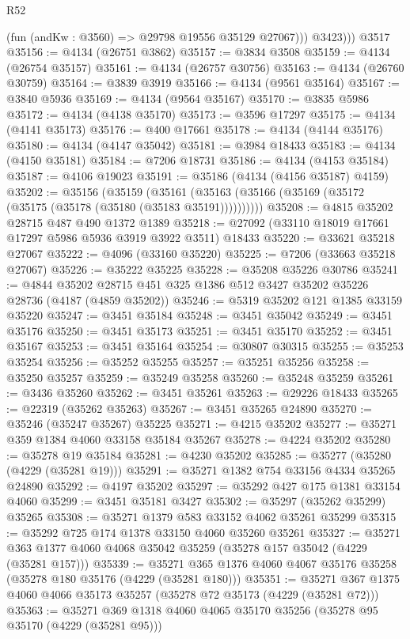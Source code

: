 \begin{lexlean}{R52}
\begin{coremodule}
            (fun (andKw : @3560) => @29798 @19556 @35129 @27067)))
          @3423)))
    @3517
@35156 := @4134 (@26751 @3862)
@35157 := @3834 @3508
@35159 := @4134 (@26754 @35157)
@35161 := @4134 (@26757 @30756)
@35163 := @4134 (@26760 @30759)
@35164 := @3839 @3919
@35166 := @4134 (@9561 @35164)
@35167 := @3840 @5936
@35169 := @4134 (@9564 @35167)
@35170 := @3835 @5986
@35172 := @4134 (@4138 @35170)
@35173 := @3596 @17297
@35175 := @4134 (@4141 @35173)
@35176 := @400 @17661
@35178 := @4134 (@4144 @35176)
@35180 := @4134 (@4147 @35042)
@35181 := @3984 @18433
@35183 := @4134 (@4150 @35181)
@35184 := @7206 @18731
@35186 := @4134 (@4153 @35184)
@35187 := @4106 @19023
@35191 := @35186 (@4134 (@4156 @35187) @4159)
@35202 := @35156
    (@35159 (@35161 (@35163 (@35166 (@35169 (@35172 (@35175 (@35178 (@35180 (@35183 @35191))))))))))
@35208 := @4815 @35202 @28715 @487 @490 @1372 @1389
@35218 := @27092 (@33110 @18019 @17661 @17297 @5986 @5936 @3919 @3922 @3511) @18433
@35220 := @33621 @35218 @27067
@35222 := @4096 (@33160 @35220)
@35225 := @7206 (@33663 @35218 @27067)
@35226 := @35222 @35225
@35228 := @35208 @35226 @30786
@35241 := @4844 @35202 @28715 @451 @325 @1386 @512 @3427 @35202 @35226 @28736 (@4187 (@4859 @35202))
@35246 := @5319 @35202 @121 @1385 @33159 @35220
@35247 := @3451 @35184
@35248 := @3451 @35042
@35249 := @3451 @35176
@35250 := @3451 @35173
@35251 := @3451 @35170
@35252 := @3451 @35167
@35253 := @3451 @35164
@35254 := @30807 @30315
@35255 := @35253 @35254
@35256 := @35252 @35255
@35257 := @35251 @35256
@35258 := @35250 @35257
@35259 := @35249 @35258
@35260 := @35248 @35259
@35261 := @3436 @35260
@35262 := @3451 @35261
@35263 := @29226 @18433
@35265 := @22319 (@35262 @35263)
@35267 := @3451 @35265 @24890
@35270 := @35246 (@35247 @35267) @35225
@35271 := @4215 @35202
@35277 := @35271 @359 @1384 @4060 @33158 @35184 @35267
@35278 := @4224 @35202
@35280 := @35278 @19 @35184
@35281 := @4230 @35202
@35285 := @35277 (@35280 (@4229 (@35281 @19)))
@35291 := @35271 @1382 @754 @33156 @4334 @35265 @24890
@35292 := @4197 @35202
@35297 := @35292 @427 @175 @1381 @33154 @4060
@35299 := @3451 @35181 @3427
@35302 := @35297 (@35262 @35299) @35265
@35308 := @35271 @1379 @583 @33152 @4062 @35261 @35299
@35315 := @35292 @725 @174 @1378 @33150 @4060 @35260 @35261
@35327 := @35271 @363 @1377 @4060 @4068 @35042 @35259 (@35278 @157 @35042 (@4229 (@35281 @157)))
@35339 := @35271 @365 @1376 @4060 @4067 @35176 @35258 (@35278 @180 @35176 (@4229 (@35281 @180)))
@35351 := @35271 @367 @1375 @4060 @4066 @35173 @35257 (@35278 @72 @35173 (@4229 (@35281 @72)))
@35363 := @35271 @369 @1318 @4060 @4065 @35170 @35256 (@35278 @95 @35170 (@4229 (@35281 @95)))

\end{coremodule}
\end{lexlean}
